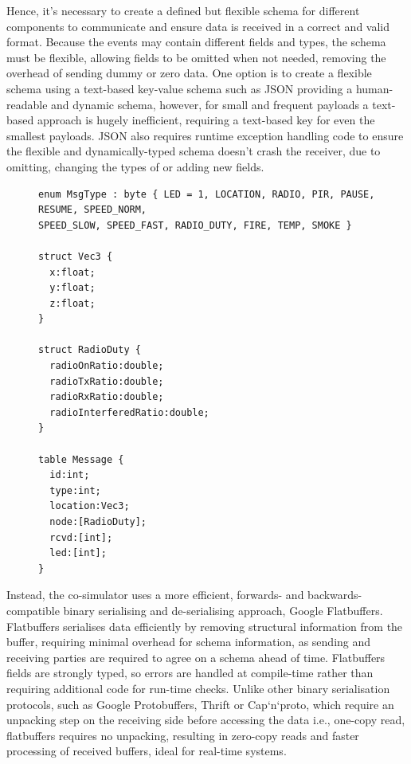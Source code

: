Hence, it's necessary to create a defined but flexible schema for different components to communicate and ensure data is received in a correct and valid format. Because the events may contain different fields and types, the schema must be flexible, allowing fields to be omitted when not needed, removing the overhead of sending dummy or zero data. One option is to create a flexible schema using a text-based key-value schema such as JSON providing a human-readable and dynamic schema, however, for small and frequent payloads a text-based approach is hugely inefficient, requiring a text-based key for even the smallest payloads. JSON also requires runtime exception handling code to ensure the flexible and dynamically-typed schema doesn't crash the receiver, due to omitting, changing the types of or adding new fields. 



\begin{figure}[htb]
  \begin{verbatim}
enum MsgType : byte { LED = 1, LOCATION, RADIO, PIR, PAUSE, RESUME, SPEED_NORM, 
SPEED_SLOW, SPEED_FAST, RADIO_DUTY, FIRE, TEMP, SMOKE }

struct Vec3 {
  x:float;
  y:float;
  z:float;
}

struct RadioDuty {
  radioOnRatio:double;
  radioTxRatio:double;
  radioRxRatio:double;
  radioInterferedRatio:double;
}

table Message {
  id:int;
  type:int;
  location:Vec3;
  node:[RadioDuty];
  rcvd:[int];
  led:[int];
}
  \end{verbatim}
\end{figure}

Instead, the co-simulator uses a more efficient, forwards- and backwards-compatible binary serialising and de-serialising approach, Google Flatbuffers\cite{flatbuffers}. Flatbuffers serialises data efficiently by removing structural information from the buffer, requiring minimal overhead for schema information, as sending and receiving parties are required to agree on a schema ahead of time. Flatbuffers fields are strongly typed, so errors are handled at compile-time rather than requiring additional code for run-time checks. Unlike other binary serialisation protocols, such as Google Protobuffers\cite{protobuffers}, Thrift\cite{apachethrift} or Cap`n`proto\cite{capnproto}, which require an unpacking step on the receiving side before accessing the data i.e., one-copy read, flatbuffers requires no unpacking, resulting in zero-copy reads and faster processing of received buffers, ideal for real-time systems.
